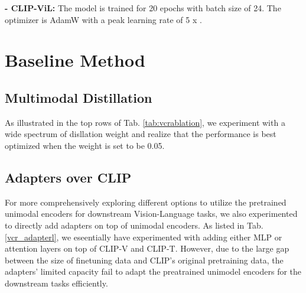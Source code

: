 \documentclass[runningheads]{llncs}
\begin{document}
\noindent\textbf{- CLIP-ViL: } The model is trained for 20 epochs with batch size of 24. The optimizer is AdamW with a peak learning rate of 5 x .

\section{Baseline Method}
\label{sec:baselinemethod}
\subsection{Multimodal Distillation}
\label{sec:baselinemethod-nkd}




As illustrated in the top rows of Tab. \ref{tab:vcrablation}, we experiment with a wide spectrum of disllation weight and realize that the performance is best optimized when the weight is set to be 0.05.
\subsection{Adapters over CLIP}
\label{sec:baselinemethod-adapters}
For more comprehensively exploring different options to utilize the pretrained unimodal encoders for downstream Vision-Language tasks, we also experimented to directly add adapters on top of unimodal encoders. As listed in Tab. \ref{vcr_adapterl}, we eseentially have experimented with adding either MLP or attention layers on top of CLIP-V and CLIP-T. However, due to the large gap between the size of finetuning data and CLIP's original pretraining data, the adapters' limited capacity fail to adapt the preatrained unimodel encoders for the downstream tasks efficiently.
\end{document}
